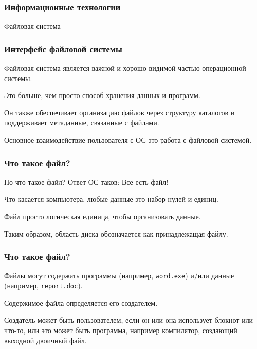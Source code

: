 \begin{frame}
\frametitle{Информационные технологии}

\begin{center}

\Huge
Файловая система
	
\end{center}

\end{frame}

\begin{frame}
\frametitle{Интерфейс файловой системы}

Файловая система является важной и хорошо видимой частью операционной системы.

Это больше, чем просто способ хранения данных и программ.

Он также обеспечивает организацию файлов через структуру каталогов и поддерживает метаданные, связанные с файлами.

Основное взаимодействие пользователя с ОС это работа с файловой системой.

\end{frame}

\begin{frame}
\frametitle{Что такое файл?}

Но что такое файл? Ответ ОС таков: \alert{Все есть файл!}

Что касается компьютера, любые данные это набор нулей и единиц.

Файл просто логическая единица, чтобы организовать данные.

Таким образом, область диска обозначается как принадлежащая файлу.
\end{frame}

\begin{frame}
\frametitle{Что такое файл?}

Файлы могут содержать программы (например, \texttt{word.exe}) и/или данные (например, \texttt{report.doc}).

Содержимое файла определяется его создателем.

Создатель может быть пользователем, если он или она использует блокнот или что-то, или это может быть программа, например компилятор, создающий выходной двоичный файл.

\end{frame}


